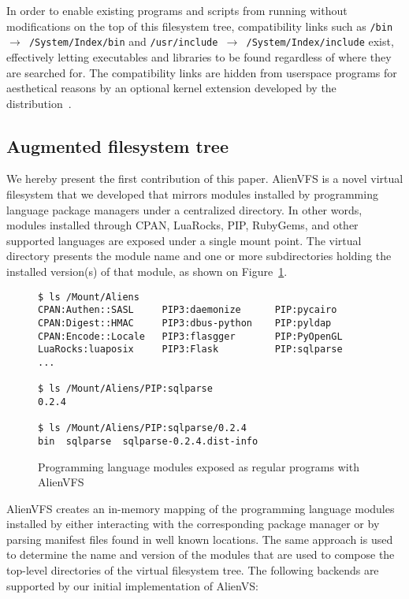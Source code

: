 \documentclass[sigplan, anonymous]{acmart}
\begin{document}
In order to enable existing programs and scripts from running without modifications on
the top of this filesystem tree, compatibility links such as
\texttt{/bin $\rightarrow$ /System/Index/bin} and
\texttt{/usr/include $\rightarrow$ /System/Index/include} exist, effectively letting
executables and libraries to be found regardless of where they are searched for.
The compatibility links are hidden from userspace programs for aesthetical reasons
by an optional kernel extension developed by the distribution~\cite{GoboHide}.

\subsection{Augmented filesystem tree}
We hereby present the first contribution of this paper. AlienVFS is a novel virtual
filesystem that we developed that mirrors modules installed by programming language
package managers under a centralized directory. In other words, modules installed
through CPAN, LuaRocks, PIP, RubyGems, and other supported languages are exposed under
a single mount point. The virtual directory presents the module name and one or more
subdirectories holding the installed version(s) of that module, as shown on
Figure~\ref{fig:alienvfs}.

\begin{figure}
    \label{fig:alienvfs}
    \caption{Programming language modules exposed as regular programs with AlienVFS}
    \begin{verbatim}
$ ls /Mount/Aliens
CPAN:Authen::SASL     PIP3:daemonize      PIP:pycairo
CPAN:Digest::HMAC     PIP3:dbus-python    PIP:pyldap
CPAN:Encode::Locale   PIP3:flasgger       PIP:PyOpenGL
LuaRocks:luaposix     PIP3:Flask          PIP:sqlparse
...

$ ls /Mount/Aliens/PIP:sqlparse
0.2.4

$ ls /Mount/Aliens/PIP:sqlparse/0.2.4
bin  sqlparse  sqlparse-0.2.4.dist-info
    \end{verbatim}
\end{figure}

AlienVFS creates an in-memory mapping of the programming language modules installed
by either interacting with the corresponding package manager or by parsing manifest
files found in well known locations. The same approach is used to determine the
name and version of the modules that are used to compose the top-level directories
of the virtual filesystem tree. The following backends are supported by our initial
implementation of AlienVS:
\end{document}
